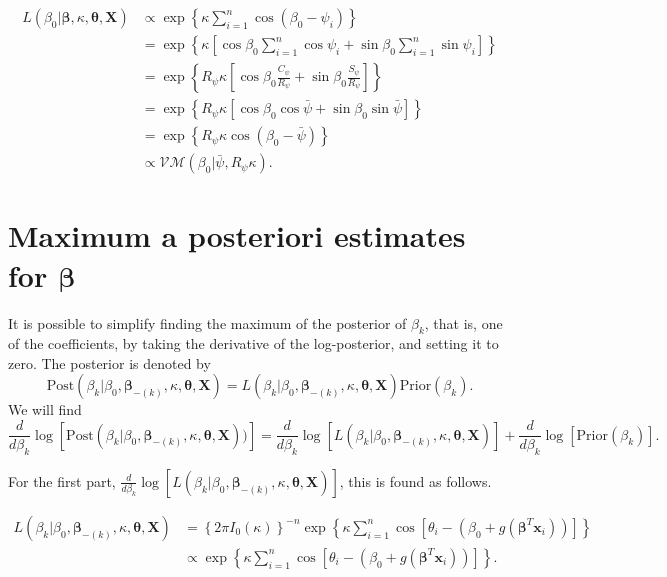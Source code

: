 \documentclass{article}\usepackage[]{graphicx}\usepackage[]{color}
\begin{document}
\begin{align*}
L(\beta_0 \vert \boldsymbol\beta, \kappa, \boldsymbol\theta, \boldsymbol{X}) & \propto \exp \left\lbrace \kappa \sum_{i=1}^n \cos ( \beta_0 - \psi_i)  \right\rbrace \\
& = \exp \left\lbrace \kappa   \left[ \cos\beta_0 \sum_{i=1}^n \cos\psi_i +  \sin\beta_0 \sum_{i=1}^n \sin\psi_i \right]  \right\rbrace \\
& = \exp \left\lbrace R_{\psi}  \kappa  \left[ \cos\beta_0 \frac{C_{\psi}}{R_{\psi}} +  \sin\beta_0 \frac{S_{\psi}}{R_{\psi}} \right]  \right\rbrace \\
& = \exp \left\lbrace R_{\psi} \kappa   \left[ \cos\beta_0 \cos{\bar\psi} +  \sin\beta_0 \sin{\bar\psi}\right]  \right\rbrace \\
& = \exp \left\lbrace R_{\psi} \kappa \cos \left( \beta_0 - \bar\psi \right)  \right\rbrace \\
& \propto \mathcal{VM}(\beta_0 \vert \bar\psi, R_{\psi} \kappa).
\end{align*}





\section{Maximum a posteriori estimates for $\boldsymbol\beta$} \label{betamle}

It is possible to simplify finding the maximum of the posterior of $\beta_k$, that is, one of the coefficients, by taking the derivative of the log-posterior, and setting it to zero. The posterior is denoted by
$$ \text{Post}(\beta_k \vert \beta_0, \boldsymbol\beta_{-(k)}, \kappa, \boldsymbol\theta, \boldsymbol{X}) = L(\beta_k \vert \beta_0, \boldsymbol\beta_{-(k)}, \kappa, \boldsymbol\theta, \boldsymbol{X}) \text{Prior}(\beta_k).$$
We will find
$$  \frac{d}{d\beta_k} \log \left[ \text{Post}(\beta_k \vert \beta_0, \boldsymbol\beta_{-(k)}, \kappa, \boldsymbol\theta, \boldsymbol{X})) \right] = \frac{d}{d\beta_k} \log \left[ L(\beta_k \vert \beta_0, \boldsymbol\beta_{-(k)}, \kappa, \boldsymbol\theta, \boldsymbol{X})\right] +  \frac{d}{d\beta_k} \log \left[ \text{Prior}(\beta_k) \right].$$

For the first part, $\frac{d}{d\beta_k} \log \left[ L(\beta_k \vert \beta_0, \boldsymbol\beta_{-(k)}, \kappa, \boldsymbol\theta, \boldsymbol{X})\right]$, this is found as follows.

\begin{align*}
L(\beta_k \vert \beta_0, \boldsymbol\beta_{-(k)}, \kappa, \boldsymbol\theta, \boldsymbol{X})  & =  \left\lbrace 2 \pi I_0(\kappa) \right\rbrace^{-n} \exp \left\lbrace \kappa \sum_{i=1}^{n} \cos \left[ \theta_i - (\beta_0 + g(\boldsymbol\beta^T \boldsymbol{x}_i)) \right]  \right\rbrace  \\
& \propto \exp \left\lbrace \kappa \sum_{i=1}^{n} \cos \left[ \theta_i - (\beta_0 + g(\boldsymbol\beta^T \boldsymbol{x}_i)) \right]  \right\rbrace.
\end{align*}
\end{document}
